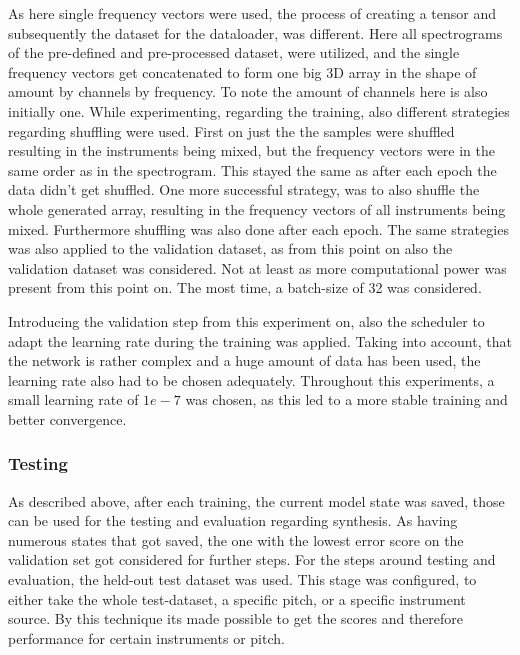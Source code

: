 As here single frequency vectors were used, the process of creating a tensor and subsequently the dataset for the dataloader, was different. Here all spectrograms of the pre-defined and pre-processed dataset, were utilized, and the single frequency vectors get concatenated to form one big 3D array in the shape of amount by channels by frequency. To note the amount of channels here is also initially one. While experimenting, regarding the training, also different strategies regarding shuffling were used. First on just the the samples were shuffled resulting in the instruments being mixed, but the frequency vectors were in the same order as in the spectrogram. This stayed the same as after each epoch the data didn't get shuffled. One more successful strategy, was to also shuffle the whole generated array, resulting in the frequency vectors of all instruments being mixed. Furthermore shuffling was also done after each epoch. The same strategies was also applied to the validation dataset, as from this point on also the validation dataset was considered. Not at least as more computational power was present from this point on. The most time, a batch-size of 32 was considered. 

Introducing the validation step from this experiment on, also the scheduler to adapt the learning rate during the training was applied. Taking into account, that the network is rather complex and a huge amount of data has been used, the learning rate also had to be chosen adequately. Throughout this experiments, a small learning rate of $1e-7$ was chosen, as this led to a more stable training and better convergence. 

\subsubsection{Testing}
As described above, after each training, the current model state was saved, those can be used for the testing and evaluation regarding synthesis. As having numerous states that got saved, the one with the lowest error score on the validation set got considered for further steps. For the steps around testing and evaluation, the held-out test dataset was used. This stage was configured, to either take the whole test-dataset, a specific pitch, or a specific instrument source. By this technique its made possible to get the scores and therefore performance for certain instruments or pitch. 

